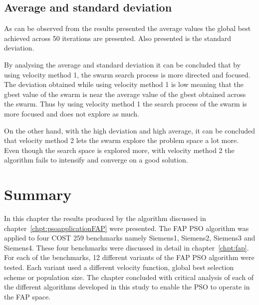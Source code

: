 \subsection{Average and standard deviation}
As can be observed from the results presented the average values the global best achieved across 50 iterations are presented. Also presented is the standard deviation.

By analysing the average and standard deviation it can be concluded that by using velocity method 1, the swarm search process is more directed and focused. The deviation obtained while using velocity method 1 is low meaning that the gbest value of the swarm is near the average value of the gbest obtained across the swarm. Thus by using velocity method 1 the search process of the swarm is more focused and does not explore as much.

On the other hand, with the high deviation and high average, it can be concluded that velocity method 2 lets the swarm explore the problem space a lot more. Even though the search space is explored more, with velocity method 2 the algorithm fails to intensify and converge on a good solution.

\section{Summary}
In this chapter the results produced by the algorithm discussed in chapter~\ref{chpt:psoapplicationFAP} were presented. The FAP PSO algorithm was applied to four COST 259 benchmarks namely Siemens1, Siemens2, Siemens3 and Siemens4. These four benchmarks were discussed in detail in chapter~\ref{chpt:fap}. For each of the benchmarks, 12 different variants of the FAP PSO algorithm were tested. Each variant used a different velocity function, global best selection scheme or population size. The chapter concluded with critical analysis of each of the different algorithms developed in this study to enable the PSO to operate in the FAP space.
